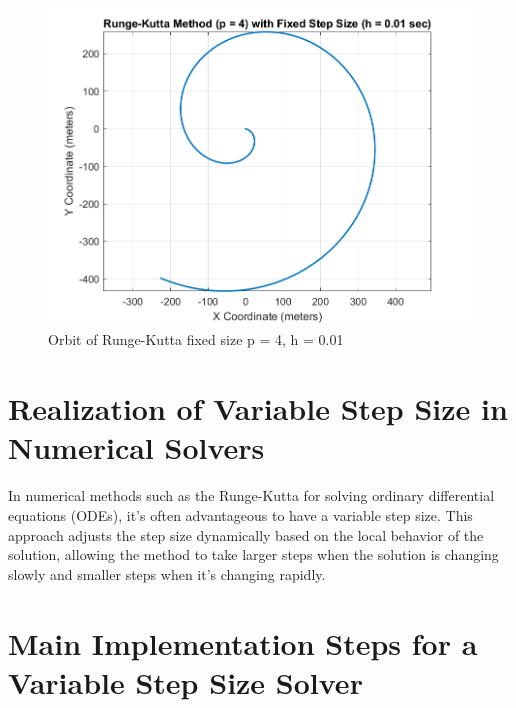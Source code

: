 \documentclass[12pt]{report}
\begin{document}
\begin{figure}
    \centering
    \includegraphics[width = 0.8 \textwidth]{step.png}
    \caption{Orbit of Runge-Kutta fixed size p = 4, h = 0.01}
\end{figure}

\FloatBarrier
\section{Realization of Variable Step Size in Numerical Solvers}

In numerical methods such as the Runge-Kutta for solving ordinary differential equations (ODEs), it's often advantageous to have a variable step size. This approach adjusts the step size dynamically based on the local behavior of the solution, allowing the method to take larger steps when the solution is changing slowly and smaller steps when it's changing rapidly. 

\section{Main Implementation Steps for a Variable Step Size Solver}
\end{document}
